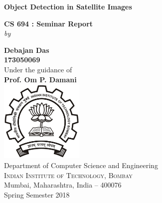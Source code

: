 \begin{titlepage}

\begin{center}

\vspace{1in}


\hline
\hline
\vspace{.15in}
{ \LARGE \bfseries Object Detection in Satellite Images}\\[0.2cm] 
\vspace{.15in}
\hline
\hline

\vspace{.3in}

\textup{\Large {\bf CS 694 : Seminar Report}}\\[0.2in]
\vspace{.25in}
\normalsize \textit{by} \\
\vspace{.3in}

\textbf{Debajan Das \\ \vspace{.1in}173050069 \\}
\vspace{.25in}
Under the guidance of\\
\vspace{.1in}
{\textbf{Prof. Om P. Damani}}\\[0.2in]
\vspace{1.25in}
\includegraphics[width=0.3\textwidth]{img/logo}\\[0.1in]
\Large{Department of Computer Science and Engineering}\\
\normalsize
\textsc{Indian Institute of Technology, Bombay}\\
Mumbai, Maharashtra, India -- 400076 \\
\vspace{0.2cm}
Spring Semester 2018

\end{center}

\end{titlepage}
